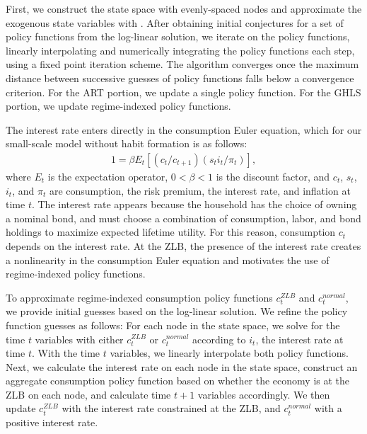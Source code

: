 \documentclass[12pt, final]{article}
\begin{document}
First, we construct the state space with evenly-spaced nodes and approximate the exogenous state variables with \hyperlink{Rouwenhorst}{\color{black}{Rouwenhorst (1995)}}. After obtaining initial conjectures for a set of policy functions from the log-linear solution, we iterate on the policy functions, linearly interpolating and numerically integrating the policy functions each step, using a fixed point iteration scheme. The algorithm converges once the maximum distance between successive guesses of policy functions falls below a convergence criterion. For the ART portion, we update a single policy function. For the GHLS portion, we update regime-indexed policy functions.

The interest rate enters directly in the consumption Euler equation, which for our small-scale model without habit formation is as follows:
\begin{gather*}
    1 = \beta E_t[(c_t/c_{t+1})(s_ti_t/\pi_{t})],
\end{gather*}
where $E_t$ is the expectation operator, $0<\beta<1$ is the discount factor, and $c_t$, $s_t$, $i_t$, and $\pi_t$ are consumption, the risk premium, the interest rate, and inflation at time $t$. The interest rate appears because the household has the choice of owning a nominal bond, and must choose a combination of consumption, labor, and bond holdings to maximize expected lifetime utility. For this reason, consumption $c_t$ depends on the interest rate. At the ZLB, the presence of the interest rate creates a nonlinearity in the consumption Euler equation and motivates the use of regime-indexed policy functions. 

To approximate regime-indexed consumption policy functions $c_t^{ZLB}$ and $c_t^{normal}$, we provide initial guesses based on the log-linear solution. We refine the policy function guesses as follows: For each node in the state space, we solve for the time $t$ variables with either $c_t^{ZLB}$  or $c_t^{normal}$ according to $i_t$, the interest rate at time $t$. With the time $t$ variables, we linearly interpolate both policy functions. Next, we calculate the interest rate on each node in the state space, construct an aggregate consumption policy function based on whether the economy is at the ZLB on each node, and calculate time $t+1$ variables accordingly. We then update $c_t^{ZLB}$ with the interest rate constrained at the ZLB, and $c_t^{normal}$ with a positive interest rate.

\end{document}

